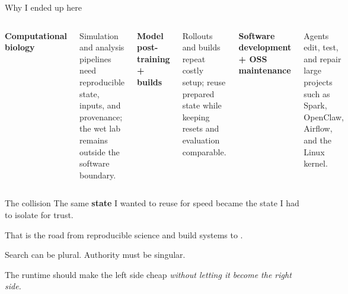 \begin{frame}{Why I ended up here}
\begin{columns}[T,onlytextwidth]
\textbf{Computational biology}\par
\normalsize Simulation and analysis pipelines need reproducible state, inputs, and provenance; the wet lab remains outside the software boundary.

\textbf{Model post-training + builds}\par
\normalsize Rollouts and builds repeat costly setup; reuse prepared state while keeping resets and evaluation comparable.

\textbf{Software development + OSS maintenance}\par
\normalsize Agents edit, test, and repair large projects such as Spark, OpenClaw, Airflow, and the Linux kernel.
\end{columns}

\vspace{0.8em}
\begin{block}{The collision}
\centering
\large The same \textbf{state} I wanted to reuse for speed became the state I had to isolate for trust.
\end{block}

\vspace{0.35em}
\centering\large
That is the road from reproducible science and build systems to .
\end{frame}

\begin{frame}{Search can be plural. Authority must be singular.}
\centering
{}

\vspace{0.35em}
\Large The runtime should make the left side cheap \emph{without letting it become the right side.}
\end{frame}
